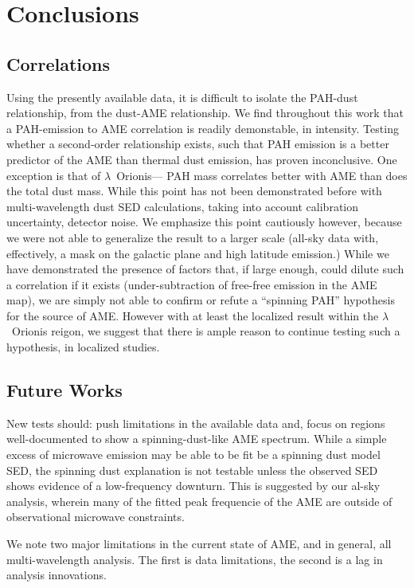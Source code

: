 \chapter{Conclusions}
  \label{ch:conclusions}

\section{Correlations }

  Using the presently available data, it is difficult to isolate the PAH-dust relationship, from the dust-AME relationship. We find throughout this work that a PAH-emission to AME correlation is readily demonstable, in intensity. Testing whether a second-order relationship exists, such that PAH emission is a better predictor of the AME than thermal dust emission, has proven inconclusive. One exception is that of $\lambda$~Orionis--- PAH mass correlates better with AME than does the total dust mass. While this point has not been demonstrated before with multi-wavelength dust SED calculations, taking into account calibration uncertainty, detector noise. We emphasize this point cautiously however, because we were not able to generalize the result to a larger scale (all-sky data with, effectively, a mask on the galactic plane and high latitude emission.) While we have demonstrated the presence of factors that, if large enough, could dilute such a correlation if it exists (under-subtraction of free-free emission in the AME map), we are simply not able to confirm or refute a ``spinning PAH'' hypothesis for the source of AME. However with at least the localized result within the $\lambda$~Orionis reigon, we suggest that there is ample reason to continue testing such a hypothesis, in localized studies.

\section{Future Works}
  New tests should: push limitations in the available data and, focus on regions well-documented to show a spinning-dust-like AME spectrum. While a simple excess of microwave emission may be able to be fit be a spinning dust model SED, the spinning dust explanation is not testable unless the observed SED shows evidence of a low-frequency downturn. This is suggested by our al-sky analysis, wherein many of the fitted peak frequencie of the AME are outside of observational microwave constraints.

  We note two major limitations in the current state of AME, and in general, all multi-wavelength analysis.
  The first is data limitations, the second is a lag in analysis innovations.


